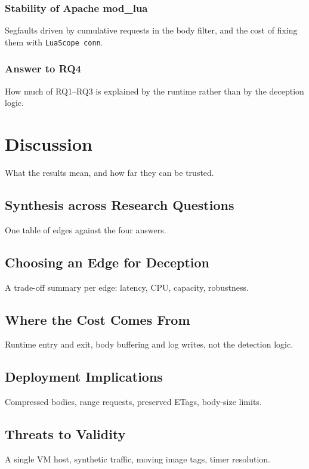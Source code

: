 \documentclass{rptuma}
\begin{document}
\subsection{Stability of Apache mod\_lua}
Segfaults driven by cumulative requests in the body filter, and the cost of fixing them with
\texttt{LuaScope conn}.
\subsection{Answer to RQ4}
How much of RQ1--RQ3 is explained by the runtime rather than by the deception logic.

\chapter{Discussion}
What the results mean, and how far they can be trusted.

\section{Synthesis across Research Questions}
One table of edges against the four answers.

\section{Choosing an Edge for Deception}
A trade-off summary per edge: latency, CPU, capacity, robustness.

\section{Where the Cost Comes From}
Runtime entry and exit, body buffering and log writes, not the detection logic.

\section{Deployment Implications}
Compressed bodies, range requests, preserved ETags, body-size limits.

\section{Threats to Validity}
A single VM host, synthetic traffic, moving image tags, timer resolution.
\end{document}
